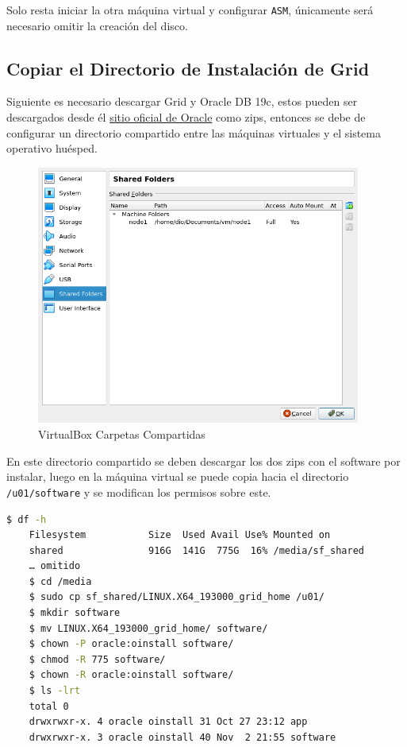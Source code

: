 \documentclass{article}
\begin{document}
Solo resta iniciar la otra máquina virtual y configurar \texttt{ASM}, únicamente será necesario omitir la creación del disco.

\subsection{Copiar el Directorio de Instalación de Grid}

Siguiente es necesario descargar Grid y Oracle DB 19c, estos pueden ser descargados desde él \href{https://www.oracle.com/in/database/technologies/oracle19c-linux-downloads.html}{sitio oficial de Oracle} como zips, entonces se debe de configurar un directorio compartido entre las máquinas virtuales y el sistema operativo huésped.

\begin{figure}[H]
		\begin{center}
			\includegraphics[width=0.95\textwidth]{vm_shared_folder.png}
		\end{center}
		\caption{VirtualBox Carpetas Compartidas}
\end{figure}

En este directorio compartido se deben descargar los dos zips con el software por instalar, luego en la máquina virtual se puede copia hacia el directorio \texttt{/u01/software} y se modifican los permisos sobre este.

\begin{lstlisting}[style=mystyle,language=bash]
	$ df -h 
	Filesystem           Size  Used Avail Use% Mounted on
	shared               916G  141G  775G  16% /media/sf_shared
	… omitido
	$ cd /media
	$ sudo cp sf_shared/LINUX.X64_193000_grid_home /u01/
	$ mkdir software
	$ mv LINUX.X64_193000_grid_home/ software/
	$ chown -P oracle:oinstall software/
	$ chmod -R 775 software/ 
	$ chown -R oracle:oinstall software/
	$ ls -lrt 
	total 0
	drwxrwxr-x. 4 oracle oinstall 31 Oct 27 23:12 app
	drwxrwxr-x. 3 oracle oinstall 40 Nov  2 21:55 software
\end{lstlisting}
\end{document}
